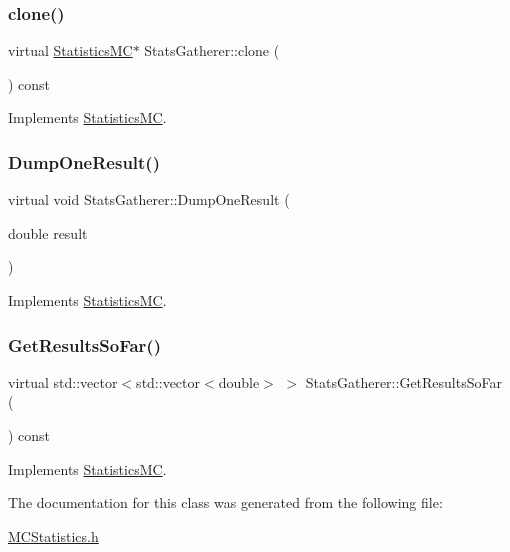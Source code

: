 \subsubsection{\texorpdfstring{clone()}{clone()}}
{\footnotesize\ttfamily virtual \hyperlink{classStatisticsMC}{Statistics\+MC}$\ast$ Stats\+Gatherer\+::clone (\begin{DoxyParamCaption}{ }\end{DoxyParamCaption}) const\hspace{0.3cm}{\ttfamily [virtual]}}



Implements \hyperlink{classStatisticsMC_af716d17e088d36f283e112ba736f8002}{Statistics\+MC}.

\hypertarget{classStatsGatherer_ae7f7e9ad4a0b0491dbcbcc27f93a89ff}{}\label{classStatsGatherer_ae7f7e9ad4a0b0491dbcbcc27f93a89ff} 
\subsubsection{\texorpdfstring{Dump\+One\+Result()}{DumpOneResult()}}
{\footnotesize\ttfamily virtual void Stats\+Gatherer\+::\+Dump\+One\+Result (\begin{DoxyParamCaption}\item[{double}]{result }\end{DoxyParamCaption})\hspace{0.3cm}{\ttfamily [virtual]}}



Implements \hyperlink{classStatisticsMC_a3ab5fb27d6933d8e35b2a55c3897cbe3}{Statistics\+MC}.

\hypertarget{classStatsGatherer_a61205b038d5c707a18660dc6cb1212d6}{}\label{classStatsGatherer_a61205b038d5c707a18660dc6cb1212d6} 
\subsubsection{\texorpdfstring{Get\+Results\+So\+Far()}{GetResultsSoFar()}}
{\footnotesize\ttfamily virtual std\+::vector$<$std\+::vector$<$double$>$ $>$ Stats\+Gatherer\+::\+Get\+Results\+So\+Far (\begin{DoxyParamCaption}{ }\end{DoxyParamCaption}) const\hspace{0.3cm}{\ttfamily [virtual]}}



Implements \hyperlink{classStatisticsMC_ae29a294b6db36c2bf46c20ac30e25aad}{Statistics\+MC}.



The documentation for this class was generated from the following file\+:\begin{DoxyCompactItemize}
\item 
\hyperlink{MCStatistics_8h}{M\+C\+Statistics.\+h}\end{DoxyCompactItemize}
